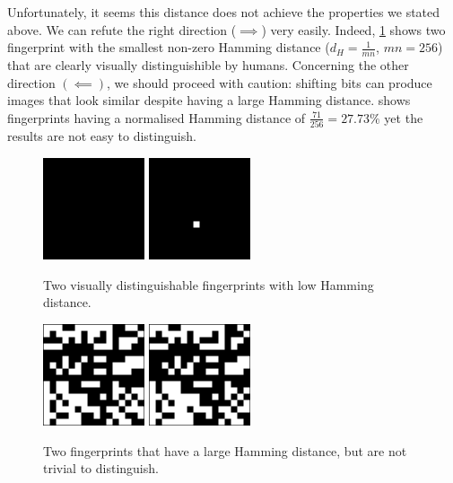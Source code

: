 \documentclass{article}
\begin{document}
Unfortunately, it seems this distance does not achieve the properties we stated above. 
We can refute the right direction ($\implies$) very easily. Indeed, \cref{fig:lowdist} shows two fingerprint with the smallest non-zero Hamming distance ($d_H = \frac{1}{mn}$, $mn = 256$) that are clearly visually distinguishible by humans. Concerning the other direction $(\impliedby)$, we should proceed with caution: shifting bits can produce images that look similar despite having a large Hamming distance. 
 shows fingerprints having a normalised Hamming distance of $\frac{71}{256} = 27.73\%$ yet the results are not easy to distinguish.

\begin{figure}[h]
    \centering
    \includegraphics[width=3cm]{figures/0000000000000.png}
    \includegraphics[width=3cm]{figures/0000000001052.png}
    \caption{Two visually distinguishable fingerprints with low Hamming distance.}
    \label{fig:lowdist}
\end{figure}
\begin{center}
\begin{figure}[h]
    \centering
    \includegraphics[width=3cm]{figures/e7e6bda110965.png}
    \includegraphics[width=3cm]{figures/e7f2bdd111301.png}
    \caption{Two fingerprints that have a large Hamming distance, but are not trivial to distinguish.}
    \label{fig:highdist}
\end{figure}
\end{center}
\end{document}

